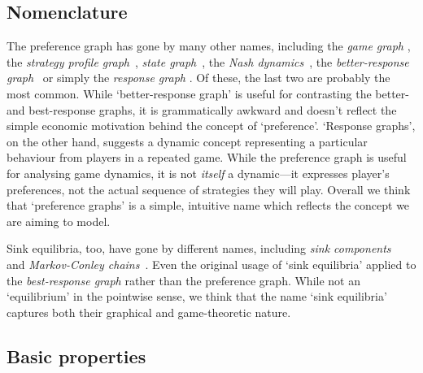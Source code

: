 \documentclass[preprint,authoryear]{elsarticle}
\begin{document}
\subsection{Nomenclature} \label{sec:nomenclature}

The preference graph has gone by many other names, including the \emph{game graph} \citep{candogan_flows_2011}, the \emph{strategy profile graph}~\citep{goemans_sink_2005}, \emph{state graph}~\citep{christodoulou_convergence_2006}, the \emph{Nash dynamics}~\citep{fabrikant_complexity_2004,mirrokni_complexity_2009}, the \emph{better-response graph}~\citep{papadimitriou_game_2019,hakim2024swim} or simply the \emph{response graph} \citep{biggar_graph_2023}. Of these, the last two are probably the most common. While `better-response graph' is useful for contrasting the better- and best-response graphs, it is grammatically awkward and doesn't reflect the simple economic motivation behind the concept of `preference'. `Response graphs', on the other hand, suggests a dynamic concept representing a particular behaviour from players in a repeated game. While the preference graph is useful for analysing game dynamics, it is not \emph{itself} a dynamic---it expresses player's preferences, not the actual sequence of strategies they will play. Overall we think that `preference graphs' is a simple, intuitive name which reflects the concept we are aiming to model.

Sink equilibria, too, have gone by different names, including \emph{sink components}~\citep{biggar_graph_2023} and \emph{Markov-Conley chains}~\citep{papadimitriou_game_2019,omidshafiei_-rank_2019}. Even the original usage of `sink equilibria' \citep{goemans_sink_2005} applied to the \emph{best-response graph} rather than the preference graph. While not an `equilibrium' in the pointwise sense, we think that the name `sink equilibria' captures both their graphical and game-theoretic nature.

\subsection{Basic properties} \label{sec: properties}
\end{document}
